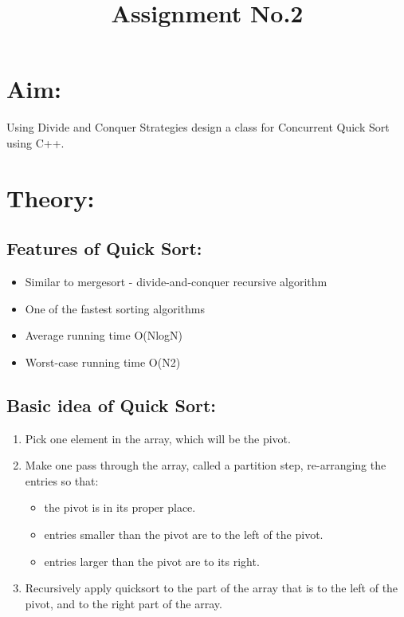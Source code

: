 \documentclass{article}
\title{Assignment No.2}
\author{}
\date{}
\begin{document}
	\maketitle
	\section{Aim:}
	Using Divide and Conquer Strategies design a class for Concurrent Quick Sort using C++.
	
	\section{Theory:}
	\subsection{Features of Quick Sort:}
	\begin{itemize}
		
		\item Similar to mergesort - divide-and-conquer recursive algorithm 
		\item One of the fastest sorting algorithms 
		\item Average running time O(NlogN) 
		\item Worst-case running time O(N2)
	\end{itemize}
	
	\subsection{Basic idea of Quick Sort:}
	\begin{enumerate}
		\item Pick one element in the array, which will be the pivot. 
		\item Make one pass through the array, called a partition step, re-arranging the entries so that: 
		\begin{itemize}
			\item the pivot is in its proper place. 
			\item entries smaller than the pivot are to the left of the pivot. 
			\item entries larger than the pivot are to its right. 
		\end{itemize}
		\item Recursively apply quicksort to the part of the array that is to the left of the pivot, and to the right part of the array. 
	\end{enumerate}
	
\end{document}
